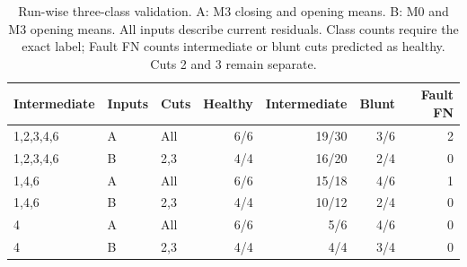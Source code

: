 \begin{table}[t]
\centering\scriptsize
\setlength{\tabcolsep}{3pt}
\caption{Run-wise three-class validation. A: M3 closing and opening means. B: M0 and M3 opening means. All inputs describe current residuals. Class counts require the exact label; Fault FN counts intermediate or blunt cuts predicted as healthy. Cuts 2 and 3 remain separate.}
\label{tab:scissors_severity}
\begin{tabularx}{\columnwidth}{@{}Xllrrrr@{}}
\toprule
Intermediate & Inputs & Cuts & Healthy & Intermediate & Blunt & Fault FN \\
\midrule
1,2,3,4,6 & A & All & 6/6 & 19/30 & 3/6 & 2 \\
1,2,3,4,6 & B & 2,3 & 4/4 & 16/20 & 2/4 & 0 \\
1,4,6 & A & All & 6/6 & 15/18 & 4/6 & 1 \\
1,4,6 & B & 2,3 & 4/4 & 10/12 & 2/4 & 0 \\
4 & A & All & 6/6 & 5/6 & 4/6 & 0 \\
4 & B & 2,3 & 4/4 & 4/4 & 3/4 & 0 \\
\bottomrule
\end{tabularx}
\end{table}